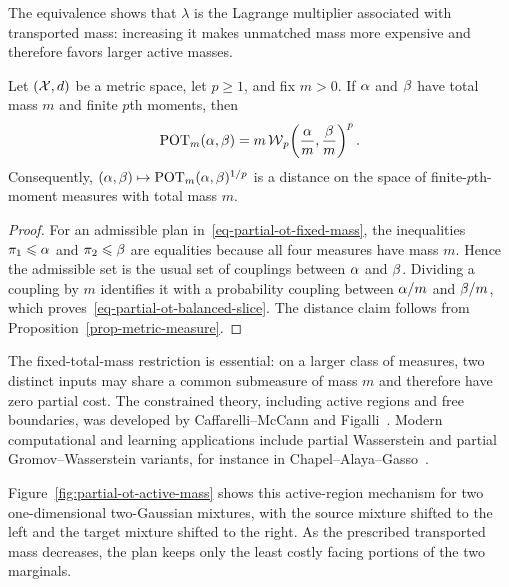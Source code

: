 The equivalence shows that $\lambda$ is the Lagrange multiplier associated with transported mass: increasing it makes unmatched mass more expensive and therefore favors larger active masses.

\begin{prop}\label{prop-partial-ot-metric-slice}
Let $(\mathcal{X},d)$ be a metric space, let $p\geq1$, and fix $m>0$. If $\alpha$ and $\beta$ have total mass $m$ and finite $p$th moments, then
\begin{equation}\label{eq-partial-ot-balanced-slice}
\operatorname{POT}_m(\alpha,\beta)
=
m\operatorname{\mathcal{W}}_p\!\left(\frac{\alpha}{m},\frac{\beta}{m}\right)^p.
\end{equation}
Consequently, $(\alpha,\beta)\mapsto\operatorname{POT}_m(\alpha,\beta)^{1/p}$ is a distance on the space of finite-$p$th-moment measures with total mass $m$.
\end{prop}

\begin{proof}
For an admissible plan in~\eqref{eq-partial-ot-fixed-mass}, the inequalities $\pi_1\leqslant\alpha$ and $\pi_2\leqslant\beta$ are equalities because all four measures have mass $m$. Hence the admissible set is the usual set of couplings between $\alpha$ and $\beta$. Dividing a coupling by $m$ identifies it with a probability coupling between $\alpha/m$ and $\beta/m$, which proves~\eqref{eq-partial-ot-balanced-slice}. The distance claim follows from Proposition~\ref{prop-metric-measure}.
\end{proof}

The fixed-total-mass restriction is essential: on a larger class of measures, two distinct inputs may share a common submeasure of mass $m$ and therefore have zero partial cost. The constrained theory, including active regions and free boundaries, was developed by Caffarelli--McCann and Figalli~\cite{CaffarelliMcCannPartial,FigalliPartial}. Modern computational and learning applications include partial Wasserstein and partial Gromov--Wasserstein variants, for instance in Chapel--Alaya--Gasso~\cite{ChapelAlayaGassoPartial}.

Figure~\ref{fig:partial-ot-active-mass} shows this active-region mechanism for two one-dimensional two-Gaussian mixtures, with the source mixture shifted to the left and the target mixture shifted to the right. As the prescribed transported mass decreases, the plan keeps only the least costly facing portions of the two marginals.

